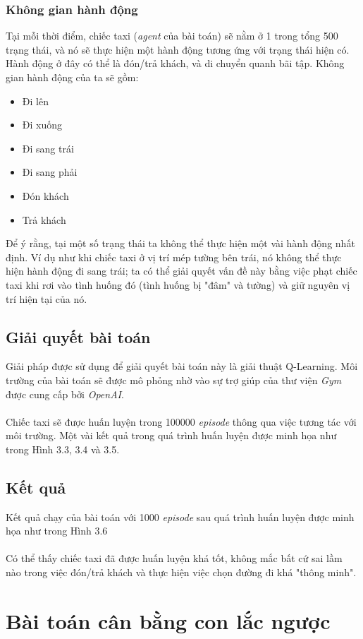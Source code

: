 \documentclass[12pt,a4paper]{report}
\begin{document}
\subsubsection{Không gian hành động}
Tại mỗi thời điểm, chiếc taxi (\textit{agent} của bài toán) sẽ nằm ở 1 trong tổng 500 trạng thái,
và nó sẽ thực hiện một hành động tương ứng với trạng thái hiện có. Hành động ở đây có thể
là đón/trả khách, và di chuyển quanh bãi tập. Không gian hành động của ta sẽ gồm:
\begin{itemize}
	\item Đi lên
	\item Đi xuống
	\item Đi sang trái
	\item Đi sang phải
	\item Đón khách
	\item Trả khách
\end{itemize}
Để ý rằng, tại một số trạng thái ta không thể thực hiện một vài hành động nhất định. Ví
dụ như khi chiếc taxi ở vị trí mép tường bên trái, nó không thể thực hiện hành động đi sang
trái; ta có thể giải quyết vấn đề này bằng việc phạt chiếc taxi khi rơi vào tình huống đó (tình
huống bị "đâm" và tường) và giữ nguyên vị trí hiện tại của nó.
\subsection{Giải quyết bài toán}
Giải pháp được sử dụng để giải quyết bài toán này là giải thuật Q-Learning. Môi trường
của bài toán sẽ được mô phỏng nhờ vào sự trợ giúp của thư viện \textit{Gym} được cung cấp bởi
\textit{OpenAI}.
\\\\Chiếc taxi sẽ được huấn luyện trong 100000 \textit{episode} thông qua việc tương tác với môi
trường. Một vài kết quả trong quá trình huấn luyện được minh họa như trong Hình 3.3, 3.4
và 3.5.
\subsection{Kết quả}
Kết quả chạy của bài toán với 1000 \textit{episode} sau quá trình huấn luyện được minh họa như
trong Hình 3.6\\\\Có thể thấy chiếc taxi đã được huấn luyện khá tốt, không mắc bất cứ sai lầm nào trong
việc đón/trả khách và thực hiện việc chọn đường đi khá "thông minh".
\section{Bài toán cân bằng con lắc ngược}
\end{document}
